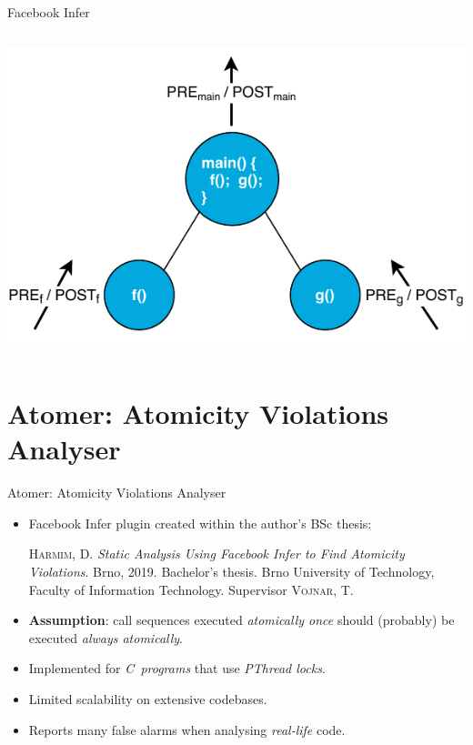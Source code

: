 \documentclass[10pt, xcolor=pdflatex, hyperref={unicode}, aspectratio=169]{beamer}
\begin{document}
\begin{frame}{Facebook Infer}
\begin{columns}
        \begin{column}{.45 \linewidth}
            \centering
            \includegraphics[width=1 \linewidth]{infer.pdf}
        \end{column}
    \end{columns}
\end{frame}


\section{Atomer: Atomicity Violations Analyser}
\begin{frame}{Atomer: Atomicity Violations Analyser}
    \begin{itemize}\setlength\itemsep{1.5em}
        \item \alert{Facebook Infer plugin} created within the author's BSc thesis:
            \medskip
            \begin{thebibliography}{1}
                \textsc{Harmim, D.} \textit{Static Analysis Using Facebook Infer to Find Atomicity Violations}. Brno, 2019. Bachelor's thesis. Brno University of Technology, Faculty of Information Technology. Supervisor \textsc{Vojnar, T.}
            \end{thebibliography}

        \item \textbf{Assumption}: \alert{call sequences} executed \emph{atomically once} should (probably) be executed \emph{always atomically}.

        \item Implemented for \emph{C~programs} that use \emph{PThread locks}.
            
        \item Limited \alert{scalability} on extensive codebases.
            
        \item Reports many \alert{false alarms} when analysing \emph{real-life} code.
    \end{itemize}
\end{frame}
\end{document}
